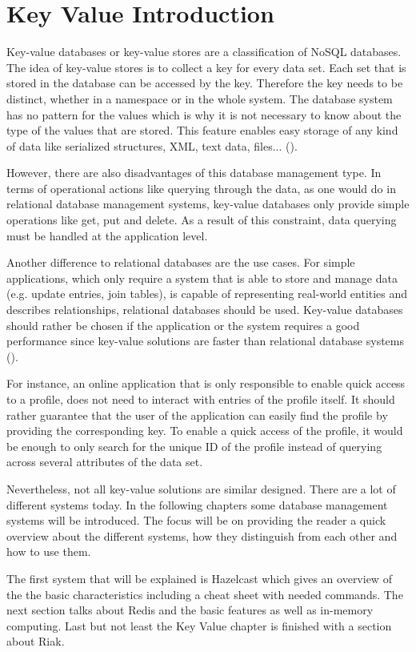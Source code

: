 \chapter{Key Value Introduction}
Key-value databases or key-value stores are a classification of NoSQL databases. 
The idea of key-value stores is to collect a key  for every data set. Each set that is stored in the database can be accessed by the key. Therefore the key needs to be distinct, whether in a namespace or in the whole system. The database system has no pattern for the values which is why it is not  necessary to know about the type of the values that are stored. This feature enables easy storage of any kind of data like serialized structures, XML, text data, files...  (\cite{keyValueIntro}).

However, there are also disadvantages of this database management type. In terms of operational actions like querying through the data, as one would do in relational database management systems, key-value databases only provide simple operations like get, put and delete. As a result of this constraint, data querying must be handled at the application level. 

Another difference to relational databases are the use cases. 
 For simple applications, which only require a system that is able to store and manage data (e.g. update entries, join tables), is capable of representing real-world entities and describes relationships, relational databases should be used. Key-value databases should rather be chosen if the application or the system requires a good performance since key-value solutions are faster than relational database systems (\cite{keyValueUsecase}).
 
For instance, an online application that is only responsible to enable quick access to a profile, does not need to interact with entries of the profile itself. It should rather guarantee that the user of the application can easily find the profile by providing the corresponding key. To enable a quick access of the profile, it would be enough to only search for the unique ID of the profile instead of querying across several attributes of the data set.

Nevertheless, not all key-value solutions are similar designed. There are a lot of different systems today. In the following chapters some database management systems will be introduced. The focus will be on providing the reader a quick overview about the different systems, how they distinguish from each other and how to use them.

The first system that will be explained is Hazelcast which gives an overview of the the basic characteristics including a cheat sheet with needed commands. The next section talks about Redis and the basic features as well as in-memory computing. Last but not least the Key Value chapter is finished with a section about Riak. 


